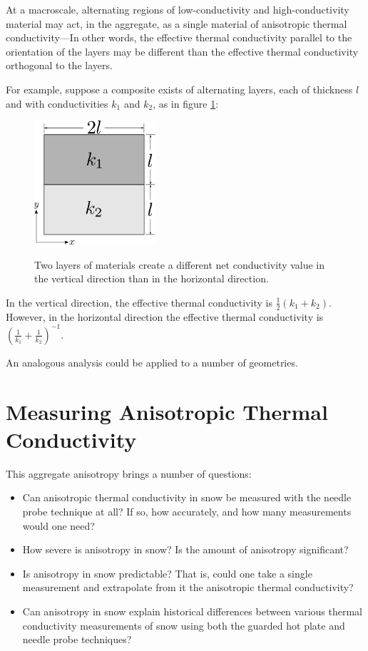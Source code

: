 At a macroscale, alternating regions of low-conductivity and high-conductivity
material may act, in the aggregate, as a single material of anisotropic thermal
conductivity---In other words, the effective thermal conductivity parallel to
the orientation of the layers may be different than the effective thermal
conductivity orthogonal to the layers.

For example, suppose a composite exists of alternating layers, each of thickness
\(l\) and with conductivities \(k_1\) and \(k_2\), as in figure
\ref{fig:ex_laminate}:

\begin{figure}[h]
\centering
\includegraphics[width=0.4\textwidth]{fig/ex_laminate.png}
\label{fig:ex_laminate}
\caption{Two layers of materials create a different net conductivity value in the vertical direction than in the horizontal direction.}
\end{figure}

In the vertical direction, the effective thermal conductivity is
\(\frac12(k_1 + k_2)\). However, in the horizontal direction the effective
thermal conductivity is \(\left( \frac1{k_1} + \frac1{k_2} \right)^{-1}\).

An analogous analysis could be applied to a number of geometries.


\section{Measuring Anisotropic Thermal Conductivity}

This aggregate anisotropy brings a number of questions:

\begin{itemize}
\item Can anisotropic thermal conductivity in snow be measured with the needle
probe technique at all? If so, how accurately, and how many measurements would
one need?
\item How severe is anisotropy in snow? Is the amount of anisotropy
significant?
\item Is anisotropy in snow predictable? That is, could one take a single
measurement and extrapolate from it the anisotropic thermal conductivity?
\item Can anisotropy in snow explain historical differences between various
thermal conductivity measurements of snow using both the guarded hot plate and
needle probe techniques?
\end{itemize}

